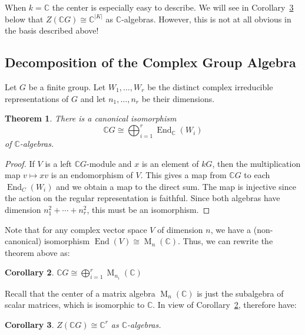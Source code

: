 \documentclass[12pt]{article}
\theoremstyle{plain}
\newtheorem{theorem}{Theorem}[section]
\newtheorem{corollary}[theorem]{Corollary}
\theoremstyle{definition}
\theoremstyle{remark}
\numberwithin{equation}{section}
\begin{document}
When $k=\mathbb{C}$ the center is especially easy to describe.
We will see in Corollary~\ref{cor:CGcenter} below that
$Z(\mathbb{C}G) \cong \mathbb{C}^{|K|}$ as $\mathbb{C}$-algebras.
However, this is not at all obvious in the
basis described above!

\subsection{Decomposition of the Complex Group Algebra}

Let $G$ be a finite group.
Let $W_1,\ldots,W_r$ be the distinct
complex irreducible representations of $G$
and let $n_1,\ldots, n_r$ be their dimensions.

\begin{theorem}
There is a canonical isomorphism
\[
\mathbb{C}G \cong \bigoplus_{i=1}^r \operatorname{End}_{\mathbb{C}}(W_i)
\]
of $\mathbb{C}$-algebras.
\end{theorem}

\begin{proof}
If $V$ is a left $\mathbb{C}G$-module and $x$ is an element of $kG$,
then the multiplication map $v \mapsto xv$ is an endomorphism
of $V$.
This gives a map from $\mathbb{C}G$ to each
$\operatorname{End}_C(W_i)$ and we obtain
a map to the direct sum.
The map is injective since the action on the regular representation
is faithful.
Since both algebras have dimension $n_1^2+\cdots+n_r^2$,
this must be an isomorphism.
\end{proof}

Note that for any complex vector space $V$ of dimension $n$, we have
a (non-canonical) isomorphism
$\operatorname{End}(V) \cong \operatorname{M}_n(\mathbb{C})$.
Thus, we can rewrite the theorem above as:  

\begin{corollary} \label{cor:fourier_as_matrices}
$\displaystyle
\mathbb{C}G \cong \bigoplus_{i=1}^r \operatorname{M}_{n_i}(\mathbb{C})$
\end{corollary}

Recall that the center of a matrix algebra
$\operatorname{M}_n(\mathbb{C})$ is just the subalgebra of scalar
matrices, which is isomorphic to $\mathbb{C}$.
In view of Corollary~\ref{cor:fourier_as_matrices},
therefore have:

\begin{corollary} \label{cor:CGcenter}
$\displaystyle Z(\mathbb{C}G) \cong \mathbb{C}^r$
as $\mathbb{C}$-algebras.
\end{corollary}
\end{document}

